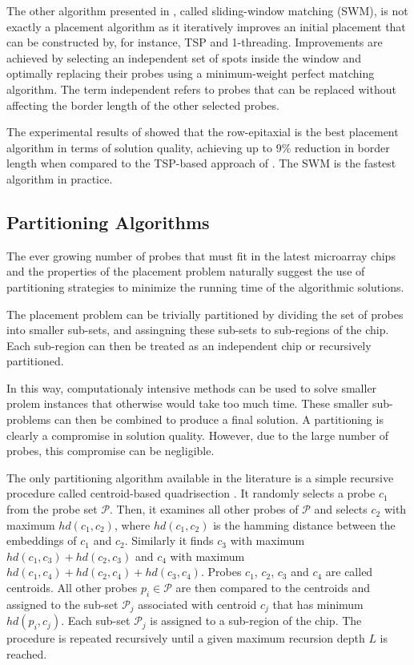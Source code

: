 \documentclass{bioinfo}
\begin{document}
The other algorithm presented in \citep{KAHNG03_1}, called sliding-window matching (SWM), is not exactly a placement algorithm as it iteratively improves an initial placement that can be constructed by, for instance, TSP and 1-threading. Improvements are achieved by selecting an independent set of spots inside the window and optimally replacing their probes using a minimum-weight perfect matching algorithm. The term independent refers to probes that can be replaced without affecting the border length of the other selected probes.

The experimental results of \citealp{KAHNG03_1} showed that the row-epitaxial is the best placement algorithm in terms of solution quality, achieving up to 9\% reduction in border length when compared to the TSP-based approach of \citealp{HANNENHALLI02}. The SWM is the fastest algorithm in practice.

\subsection{Partitioning Algorithms}

The ever growing number of probes that must fit in the latest microarray chips and the  properties of the placement problem naturally suggest the use of partitioning strategies to minimize the running time of the algorithmic solutions.

The placement problem can be trivially partitioned by dividing the set of probes into smaller sub-sets, and assingning these sub-sets to sub-regions of the chip. Each sub-region can then be treated as an independent chip or recursively partitioned.

In this way, computationaly intensive methods can be used to solve smaller prolem instances that otherwise would take too much time. These smaller sub-problems can then be combined to produce a final solution. A partitioning is clearly a compromise in solution quality. However, due to the large number of probes, this compromise can be negligible.

The only partitioning algorithm available in the literature is a simple recursive procedure called centroid-based quadrisection \citep{KAHNG03_1}. It randomly selects a probe $c_1$ from the probe set $\mathcal{P}$. Then, it examines all other probes of $\mathcal{P}$ and selects $c_2$ with maximum $hd(c_1,c_2)$, where $hd(c_1,c_2)$ is the hamming distance between the embeddings of $c_1$ and $c_2$. Similarly it finds $c_3$ with maximum $hd(c_1,c_3) + hd(c_2,c_3)$ and $c_4$ with maximum $hd(c_1,c_4) + hd(c_2,c_4) + hd(c_3,c_4)$. Probes $c_1$, $c_2$, $c_3$ and $c_4$ are called centroids. All other probes $p_i \in \mathcal{P}$ are then compared to the centroids and assigned to the sub-set $\mathcal{P}_j$ associated with centroid $c_j$ that has minimum $hd(p_i,c_j)$. Each sub-set $\mathcal{P}_j$ is assigned to a sub-region of the chip. The procedure is repeated recursively until a given maximum recursion depth $L$ is reached.
\end{document}
